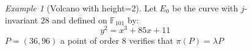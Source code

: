 \documentclass[10pt,a4paper]{beamer}
\theoremstyle{plain}
\theoremstyle{definition}
\theoremstyle{definition}
\theoremstyle{definition}
\theoremstyle{definition}
\theoremstyle{remark}
\theoremstyle{remark}
\newtheorem{exe}[thm]{Example}
\begin{document}
\begin{frame}
\begin{columns}

\begin{column}{4cm}
\begin{exe}[Volcano with height=2]
Let $E_0$ be the curve with $j$-invariant $28$ and defined on $\mathbb{F}_{101}$ by: 
\[y^2=x^3+85x+11\]
$P=(36,96)$ a point of order $8$ verifies that $\pi(P)=\lambda P$


\begin{itemize}
\end{itemize}


\end{exe}
\end{column}

\begin{column}{7cm}
\begin{figure}[h]
		\begin{center}
		

\end{center}
\end{figure}
\end{column}
\end{columns}
\end{frame}
\end{document}

